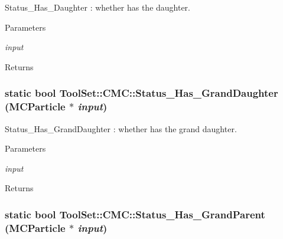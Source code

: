 Status\_\-Has\_\-Daughter : whether has the daughter. 
\begin{DoxyParams}{Parameters}
\item[{\em input}]\end{DoxyParams}
\begin{DoxyReturn}{Returns}

\end{DoxyReturn}
\hypertarget{classToolSet_1_1CMC_a79d54fb4529c17a59ab21a51b3f6889c}{
\subsubsection[{Status\_\-Has\_\-GrandDaughter}]{\setlength{\rightskip}{0pt plus 5cm}static bool ToolSet::CMC::Status\_\-Has\_\-GrandDaughter (MCParticle $\ast$ {\em input})}}
\label{classToolSet_1_1CMC_a79d54fb4529c17a59ab21a51b3f6889c}


Status\_\-Has\_\-GrandDaughter : whether has the grand daughter. 
\begin{DoxyParams}{Parameters}
\item[{\em input}]\end{DoxyParams}
\begin{DoxyReturn}{Returns}

\end{DoxyReturn}
\hypertarget{classToolSet_1_1CMC_a88ff52dd7c66369b43eb8619a1383e7d}{
\subsubsection[{Status\_\-Has\_\-GrandParent}]{\setlength{\rightskip}{0pt plus 5cm}static bool ToolSet::CMC::Status\_\-Has\_\-GrandParent (MCParticle $\ast$ {\em input})}}
\label{classToolSet_1_1CMC_a88ff52dd7c66369b43eb8619a1383e7d}


